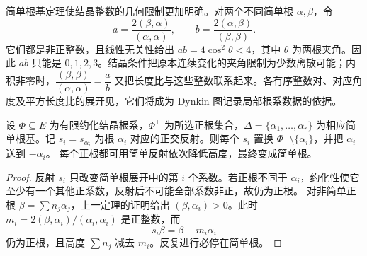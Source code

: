 简单根基定理使结晶整数的几何限制更加明确。对两个不同简单根 \(\alpha,\beta\)，令
\[
	a=\frac{2(\beta,\alpha)}{(\alpha,\alpha)},\qquad b=\frac{2(\alpha,\beta)}{(\beta,\beta)}.
\]
它们都是非正整数，且线性无关性给出 \(ab=4\cos^2\theta<4\)，其中 \(\theta\) 为两根夹角。因此 \(ab\) 只能是 \(0,1,2,3\)。结晶条件把原本连续变化的夹角限制为少数离散可能；内积非零时，\(\dfrac{(\beta,\beta)}{(\alpha,\alpha)}=\dfrac ab\) 又把长度比与这些整数联系起来。各有序整数对、对应角度及平方长度比的展开见，它们将成为 Dynkin 图记录局部根系数据的依据。

\begin{proposition}\label{b5:prop:simple-reflection-positive}
	设 \(\Phi\subseteq E\) 为有限约化结晶根系，\(\Phi^+\) 为所选正根集合，\(\Delta=\{\alpha_1,\ldots,\alpha_r\}\) 为相应简单根基。记 \(s_i=s_{\alpha_i}\) 为根 \(\alpha_i\) 对应的正交反射。则每个 \(s_i\) 置换 \(\Phi^+\setminus\{\alpha_i\}\)，并把 \(\alpha_i\) 送到 \(-\alpha_i\)。 每个正根都可用简单反射依次降低高度，最终变成简单根。
\end{proposition}
\begin{proof}
	反射 \(s_i\) 只改变简单根展开中的第 \(i\) 个系数。若正根不同于 \(\alpha_i\)，约化性使它至少有一个其他正系数，反射后不可能全部系数非正，故仍为正根。 对非简单正根 \(\beta=\sum n_j\alpha_j\)，上一定理的证明给出 \((\beta,\alpha_i)>0\)。此时 \(m_i=2(\beta,\alpha_i)/(\alpha_i,\alpha_i)\) 是正整数，而
	\[
		s_i\beta=\beta-m_i\alpha_i
	\]
	仍为正根，且高度 \(\sum n_j\) 减去 \(m_i\)。反复进行必停在简单根。
\end{proof}

